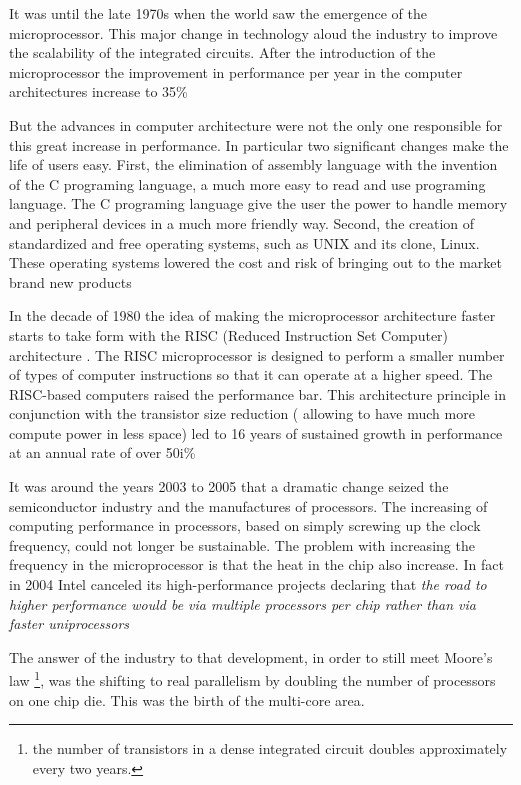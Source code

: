 It was until the late 1970s  when the world saw the emergence of the
microprocessor. This major change in technology aloud the industry to improve
the scalability of the integrated circuits. After the introduction of the
microprocessor the improvement in performance per year in the computer
architectures increase to 35\% \cite{Hennessy}   

But the advances in computer architecture were not the only one responsible for
this great increase in performance. In particular two significant changes make
the life of users easy. First, the elimination of assembly language with the
invention of the C programing language, a much more easy to read and use
programing language. The C programing language give the user the power to
handle memory and peripheral devices in a much more friendly way. Second, the
creation of standardized and free  operating systems, such as UNIX and its
clone, Linux. These operating systems lowered the cost and risk of bringing out
to the market brand new products

In the decade of 1980 the idea of making the microprocessor architecture faster
starts to take form with the RISC (Reduced Instruction Set Computer)
architecture .  The RISC microprocessor is designed to perform a smaller number
of types of computer instructions so that it can operate at a higher speed. 
The RISC-based computers raised the performance bar. This architecture
principle in conjunction with the transistor size reduction ( allowing to have
much more compute power in less space) led to 16 years of sustained growth in
performance at an annual rate of over 50i\%

It was around the years 2003 to 2005 that a dramatic change seized the
semiconductor industry and the manufactures of processors. The increasing of
computing performance in processors, based on simply screwing up the clock
frequency, could not longer be sustainable. The problem with increasing the
frequency in the microprocessor is that the heat in the chip also increase.  In
fact in 2004 Intel canceled its high-performance projects declaring that
\textit{the road to higher performance would be via multiple processors per
chip rather than via faster uniprocessors}

The answer of the industry to that development, in order to still meet Moore's
law \footnote{the number of transistors in a dense integrated circuit doubles
approximately every two years.}, was the shifting to real parallelism by
doubling the number of processors on one chip die. This was the birth of the
multi-core area. 

